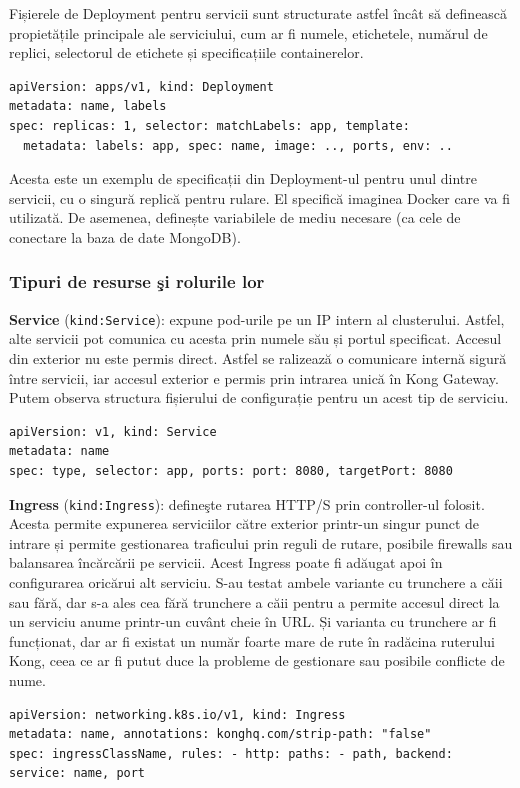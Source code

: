 Fișierele de Deployment pentru servicii sunt structurate astfel încât să definească
propietățile principale ale serviciului, cum ar fi numele, etichetele,
numărul de replici, selectorul de etichete și specificațiile containerelor.
\begin{lstlisting}[style=yamlstyle]
apiVersion: apps/v1, kind: Deployment
metadata: name, labels
spec: replicas: 1, selector: matchLabels: app, template:
  metadata: labels: app, spec: name, image: .., ports, env: ..
\end{lstlisting}

Acesta este un exemplu de specificații din Deployment-ul pentru unul dintre servicii, cu o singură replică pentru rulare.
El specifică imaginea Docker care va fi utilizată. De asemenea, definește variabilele de mediu necesare (ca cele de conectare
la baza de date MongoDB).

\subsubsection*{Tipuri de resurse şi rolurile lor}

\textbf{Service} (\texttt{kind:Service}): expune pod-urile pe un IP intern al clusterului.
Astfel, alte servicii pot comunica cu acesta prin numele său și portul specificat. Accesul
din exterior nu este permis direct. Astfel se ralizează o comunicare internă sigură între 
servicii, iar accesul exterior e permis prin intrarea unică în Kong Gateway. Putem observa
structura fișierului de configurație pentru un acest tip de serviciu.
\begin{lstlisting}[style=yamlstyle]
apiVersion: v1, kind: Service
metadata: name
spec: type, selector: app, ports: port: 8080, targetPort: 8080
\end{lstlisting}

\textbf{Ingress} (\texttt{kind:Ingress}): defineşte rutarea HTTP/S prin controller-ul folosit.
Acesta permite expunerea serviciilor către exterior printr-un singur punct de intrare și permite
gestionarea traficului prin reguli de rutare, posibile firewalls sau balansarea încărcării pe 
servicii. Acest Ingress poate fi adăugat apoi în configurarea 
oricărui alt serviciu. S-au testat ambele variante cu trunchere a căii sau fără,
dar s-a ales cea fără trunchere a căii pentru a permite accesul direct la un serviciu
anume printr-un cuvânt cheie în URL. Și varianta cu trunchere ar fi funcționat, dar
ar fi existat un număr foarte mare de rute în radăcina ruterului Kong, ceea ce ar fi
putut duce la probleme de gestionare sau posibile conflicte de nume.
\begin{lstlisting}[style=yamlstyle]
apiVersion: networking.k8s.io/v1, kind: Ingress
metadata: name, annotations: konghq.com/strip-path: "false"
spec: ingressClassName, rules: - http: paths: - path, backend: service: name, port
\end{lstlisting}

